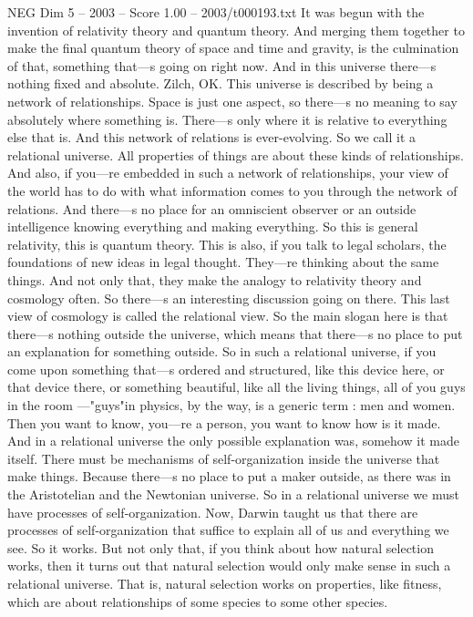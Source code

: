 \begin{textsample}{NEG Dim 5 – 2003 – Score 1.00 – 2003/t000193.txt}
It was begun with the invention of relativity theory and quantum theory.
And merging them together to make the final quantum theory of space and time and gravity, is the culmination of that, something that—s going on right now.
And in this universe there—s nothing fixed and absolute.
Zilch, OK.
This universe is described by being a network of relationships.
Space is just one aspect, so there—s no meaning to say absolutely where something is.
There—s only where it is relative to everything else that is.
And this network of relations is ever-evolving.
So we call it a relational universe.
All properties of things are about these kinds of relationships.
And also, if you—re embedded in such a network of relationships, your view of the world has to do with what information comes to you through the network of relations.
And there—s no place for an omniscient observer or an outside intelligence knowing everything and making everything.
So this is general relativity, this is quantum theory.
This is also, if you talk to legal scholars, the foundations of new ideas in legal thought.
They—re thinking about the same things.
And not only that, they make the analogy to relativity theory and cosmology often.
So there—s an interesting discussion going on there.
This last view of cosmology is called the relational view.
So the main slogan here is that there—s nothing outside the universe, which means that there—s no place to put an explanation for something outside.
So in such a relational universe, if you come upon something that—s ordered and structured, like this device here, or that device there, or something beautiful, like all the living things, all of you guys in the room —"guys"in physics, by the way, is a generic term : men and women.
Then you want to know, you—re a person, you want to know how is it made.
And in a relational universe the only possible explanation was, somehow it made itself.
There must be mechanisms of self-organization inside the universe that make things.
Because there—s no place to put a maker outside, as there was in the Aristotelian and the Newtonian universe.
So in a relational universe we must have processes of self-organization.
Now, Darwin taught us that there are processes of self-organization that suffice to explain all of us and everything we see.
So it works.
But not only that, if you think about how natural selection works, then it turns out that natural selection would only make sense in such a relational universe.
That is, natural selection works on properties, like fitness, which are about relationships of some species to some other species.

\end{textsample}

